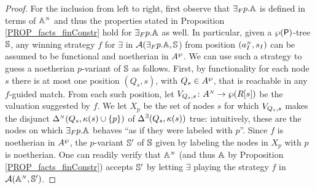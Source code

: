 \begin{proof} %
For the inclusion from left to right, first observe that ${{\exists}_F p}.\mathbb{A}$ is defined in terms of $\mathbb{A}^{{\scriptscriptstyle N}}$ and thus the properties stated in Proposition \ref{PROP_facts_finConstr} hold for ${{\exists}_F p}.\mathbb{A}$ as well. In particular, given a ${\wp (\mathsf{P})}$-tree $\mathbb{S}$, any winning strategy $f$ for $\exists$ in $\mathcal{A}({{\exists}_F p}.\mathbb{A}, \mathbb{S}$) from position $(a_I^{{\scriptscriptstyle N}},s_I)$ can be assumed to be functional and noetherian in $A^{\wp}$. We can use such a strategy to guess a noetherian $p$-variant of $\mathbb{S}$ as follows. First, by functionality for each node $s$ there is at most one position $(Q_s,s)$, with $Q_s \in A^{\wp}$, that is reachable in any $f$-guided match. From each such position, let $V_{Q_s,s} \colon A^{{\scriptscriptstyle N}} \to \wp (R[s])$ be the valuation suggested by $f$. We let $X_p$ be the set of nodes $s$ for which $V_{Q_s,s}$ makes the disjunct $\Delta^{{\scriptscriptstyle N}}(Q_s,\kappa(s)\cup\{p\})$ of $\Delta^\exists(Q_s,\kappa(s))$ true: intuitively, these are the nodes on which ${{\exists}_F p}.\mathbb{A}$ behaves ``as if they were labeled with $p$''. Since $f$ is noetherian in $A^{\wp}$, the $p$-variant $\mathbb{S}'$ of $\mathbb{S}$ given by labeling the nodes in $X_p$ with $p$ is noetherian. One can readily verify that $\mathbb{A}^{{\scriptscriptstyle N}}$ (and thus $\mathbb{A}$ by Proposition \ref{PROP_facts_finConstr}) accepts $\mathbb{S}'$ by letting $\exists$ playing the strategy $f$ in $\mathcal{A}(\mathbb{A}^{{\scriptscriptstyle N}},\mathbb{S}')$.


\end{proof}
